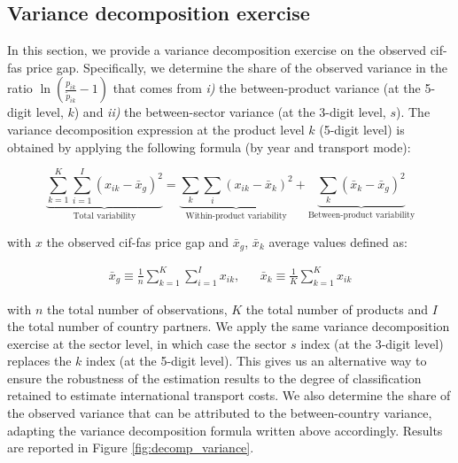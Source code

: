 \documentclass[a4paper,11pt]{article}
\begin{document}
\subsection{Variance decomposition exercise \label{app:decomp_variance}}

In this section, we provide a variance decomposition exercise on the observed cif-fas price gap.
Specifically, we determine the share of the observed variance in the ratio $\ln(\frac{p_{ik}}{\widetilde{p}_{ik}}-1)$ that comes from \textit{i)} the between-product variance (at the 5-digit level, $k$) and \textit{ii)} the between-sector variance (at the 3-digit level, $s$).
The variance decomposition expression at the product level $k$ (5-digit level) is obtained by applying the following formula (by year and transport mode):

$$\underbrace{\sum_{k=1}^K \sum_{i=1}^I \left(x_{ik} - \bar{x}_g  \right)^2}_{\text{Total variability}} = \underbrace{\sum_k \sum_i \left(x_{ik} - \bar{x}_k  \right)^2}_{\text{Within-product variability}} + \underbrace{\sum_k \left(\bar{x}_{k} - \bar{x}_g  \right)^2}_{\text{Between-product variability}}$$

with $x$ the observed cif-fas price gap and $\bar{x}_g$, $\bar{x}_k$ average values defined as:

\begin{eqnarray*}
\bar{x}_g \equiv \frac{1}{n} \sum_{k=1}^K \sum_{i=1}^I x_{ik},&& \bar{x}_k \equiv \frac{1}{K}\sum_{k=1}^K x_{ik}
\end{eqnarray*}

\noindent with $n$ the total number of observations, $K$ the total number of products and $I$ the total number of country partners.
We apply the same variance decomposition exercise at the sector level, in which case the sector $s$ index (at the 3-digit level) replaces the $k$ index (at the 5-digit level).
This gives us an alternative way to ensure the robustness of the estimation results to the degree of classification retained to estimate international transport costs.
We also determine the share of the observed variance that can be attributed to the between-country variance, adapting the variance decomposition formula written above accordingly.
Results are reported in Figure \ref{fig:decomp_variance}.
\end{document}

